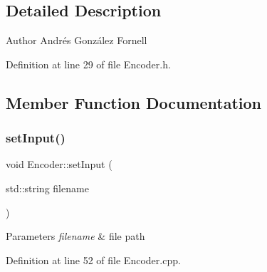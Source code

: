 \subsection{Detailed Description}
\begin{DoxyAuthor}{Author}
Andrés González Fornell 
\end{DoxyAuthor}


Definition at line 29 of file Encoder.\+h.



\subsection{Member Function Documentation}
\mbox{\label{class_encoder_af5623d0bd5fc7b1b2be27375d2994eb1}} 
\subsubsection{\texorpdfstring{set\+Input()}{setInput()}}
{\footnotesize\ttfamily void Encoder\+::set\+Input (\begin{DoxyParamCaption}\item[{std\+::string}]{filename }\end{DoxyParamCaption})}


\begin{DoxyParams}{Parameters}
{\em filename} & file path \\
\hline
\end{DoxyParams}


Definition at line 52 of file Encoder.\+cpp.

